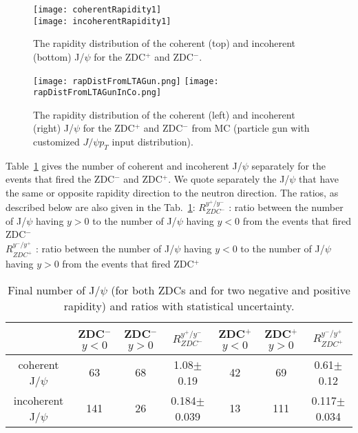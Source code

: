     \begin{figure*}[!Hhtb]
      \begin{center}
        \texttt{[image: coherentRapidity1]}\\
            \texttt{[image: incoherentRapidity1]}
             \caption{
        \label{fig:r5}  
        The rapidity distribution of the coherent (top) and incoherent (bottom) J/$\psi$ for the  ZDC$^{+}$ and ZDC$^{-}$. 
            }
           \end{center}
    \end{figure*}
    
    \begin{figure*}[!Hhtb]
      \begin{center}
        \texttt{[image: rapDistFromLTAGun.png]}
            \texttt{[image: rapDistFromLTAGunInCo.png]}
                 \caption{
        \label{fig:r6}  
          The rapidity distribution of the coherent (left) and incoherent (right) J/$\psi$ for the  ZDC$^{+}$ and ZDC$^{-}$ from MC (particle gun with customized $J/\psi p_{T}$ input distribution). 
            }
           \end{center}
    \end{figure*}
    
    Table~\ref{tab:uref} gives the number of coherent and incoherent J/$\psi$ 
      separately for the events that fired the ZDC$^{-}$ and ZDC$^{+}$. 
    We quote separately the J/$\psi$ that have the same or opposite rapidity 
      direction to the neutron direction. 
    The ratios, as described below are also given in the Tab.~\ref{tab:uref}: 
      $R_{ZDC^{-}}^{y^{+}/y^{-}}$ : ratio between the number of J/$\psi$ having 
        $y>0$ to the number of J/$\psi$ having $y<0$ from the events that fired 
        ZDC$^{-}$\\
      $R_{ZDC^{+}}^{y^{-}/y^{+}}$ : ratio between the number of J/$\psi$ having 
        $y<0$ to the number of J/$\psi$ having $y>0$ from the events that fired 
        ZDC$^{+}$\\
    
    \begin{table}[h]
    \begin{center}
    
    \caption{Final number of J/$\psi$ (for both ZDCs and for two negative and positive rapidity) and ratios with statistical uncertainty.}
    \label{tab:uref}
    \begin{tabular}{|c|c|c|c|c|c|c|}
    \hline
    & ZDC$^{-}$ $y<0$ & ZDC$^{-}$ $y>0$ & $R_{ZDC^{-}}^{y^{+}/y^{-}}$  & ZDC$^{+}$ $y<0$& ZDC$^{+}$ $y>0$& $R_{ZDC^{+}}^{y^{-}/y^{+}}$ \\ 
    \hline
    coherent J/$\psi$ & 63&68&1.08$\pm$0.19& 42&69 & 0.61$\pm$0.12 \\
    \hline
     incoherent J/$\psi$ &141 &26&0.184$\pm$0.039& 13&111& 0.117$\pm$0.034\\
    \hline
    \end{tabular}
    \end{center}
    
    \end{table}
    
